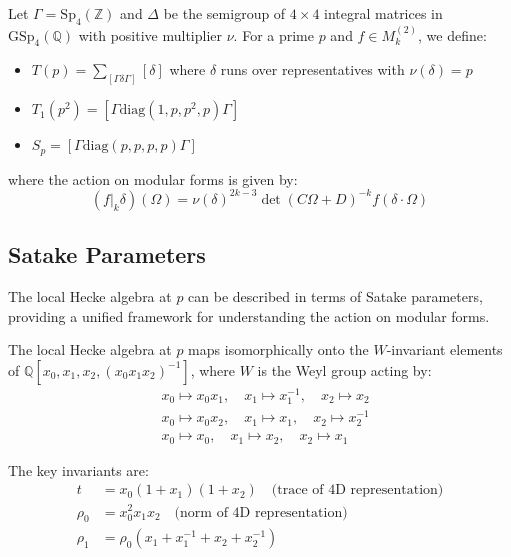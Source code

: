 \begin{definition}
\label{def:siegel_hecke}
Let $\Gamma = \mathrm{Sp}_4(\mathbb{Z})$ and $\Delta$ be the semigroup of $4 \times 4$ integral matrices in $\mathrm{GSp}_4(\mathbb{Q})$ with positive multiplier $\nu$. For a prime $p$ and $f \in M_k^{(2)}$, we define:
\begin{itemize}
\item $T(p) = \sum_{[\Gamma \delta \Gamma]} [\delta]$ where $\delta$ runs over representatives with $\nu(\delta) = p$
\item $T_1(p^2) = [\Gamma \mathrm{diag}(1,p,p^2,p) \Gamma]$
\item $S_p = [\Gamma \mathrm{diag}(p,p,p,p) \Gamma]$
\end{itemize}
where the action on modular forms is given by:
\begin{equation}
(f|_k \delta)(\Omega) = \nu(\delta)^{2k-3} \det(C\Omega + D)^{-k} f(\delta \cdot \Omega)
\label{eq:hecke_action}
\end{equation}
\end{definition}

\subsection{Satake Parameters}

The local Hecke algebra at $p$ can be described in terms of Satake parameters, providing a unified framework for understanding the action on modular forms.

\begin{theorem}
\label{thm:satake_genus2}
The local Hecke algebra at $p$ maps isomorphically onto the $W$-invariant elements of $\mathbb{Q}[x_0, x_1, x_2, (x_0 x_1 x_2)^{-1}]$, where $W$ is the Weyl group acting by:
\begin{align}
&x_0 \mapsto x_0 x_1, \quad x_1 \mapsto x_1^{-1}, \quad x_2 \mapsto x_2 \\
&x_0 \mapsto x_0 x_2, \quad x_1 \mapsto x_1, \quad x_2 \mapsto x_2^{-1} \\
&x_0 \mapsto x_0, \quad x_1 \mapsto x_2, \quad x_2 \mapsto x_1
\end{align}
\end{theorem}

The key invariants are:
\begin{align}
t &= x_0(1 + x_1)(1 + x_2) \quad \text{(trace of 4D representation)} \\
\rho_0 &= x_0^2 x_1 x_2 \quad \text{(norm of 4D representation)} \\
\rho_1 &= \rho_0(x_1 + x_1^{-1} + x_2 + x_2^{-1})
\end{align}

